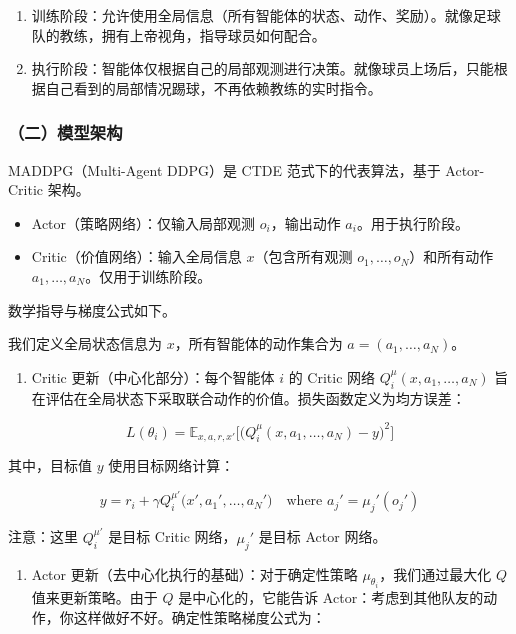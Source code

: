 \begin{enumerate}
\def\labelenumi{\arabic{enumi}.}
\item
  训练阶段：允许使用全局信息（所有智能体的状态、动作、奖励）。就像足球队的教练，拥有上帝视角，指导球员如何配合。
\item
  执行阶段：智能体仅根据自己的局部观测进行决策。就像球员上场后，只能根据自己看到的局部情况踢球，不再依赖教练的实时指令。
\end{enumerate}

\hypertarget{ux4e8cux6a21ux578bux67b6ux6784}{%
\subsubsection{（二）模型架构}\label{ux4e8cux6a21ux578bux67b6ux6784}}

MADDPG（Multi-Agent DDPG）是 CTDE 范式下的代表算法，基于 Actor-Critic 架构。

\begin{itemize}
\tightlist
\item
  Actor（策略网络）：仅输入局部观测 \(o_i\)，输出动作 \(a_i\)。用于执行阶段。
\item
  Critic（价值网络）：输入全局信息 \(x\)（包含所有观测 \(o_1,\ldots,o_N\)）和所有动作 \(a_1,\ldots,a_N\)。仅用于训练阶段。
\end{itemize}

数学指导与梯度公式如下。

我们定义全局状态信息为 \(x\)，所有智能体的动作集合为 \(a=(a_1,\ldots,a_N)\)。

\begin{enumerate}
\def\labelenumi{\arabic{enumi}.}
\tightlist
\item
{}
  Critic 更新（中心化部分）：每个智能体 \(i\) 的 Critic 网络 \(Q_i^{\mu}(x,a_1,\ldots,a_N)\) 旨在评估在全局状态下采取联合动作的价值。损失函数定义为均方误差：
\end{enumerate}

\[
L(\theta_i)
=
\mathbb{E}_{x,a,r,x'}
\bigl[
\bigl(
Q_i^{\mu}(x,a_1,\ldots,a_N)-y
\bigr)^{2}
\bigr]
\]

其中，目标值 \(y\) 使用目标网络计算：

\[
y
=
r_i
+
\gamma
Q_i^{\mu'}\bigl(
x',
a_1',
\ldots,
a_N'
\bigr)
\quad
\text{where }
a_j'=\mu_j'(o_j')
\]

注意：这里 \(Q_i^{\mu'}\) 是目标 Critic 网络，\(\mu_j'\) 是目标 Actor 网络。

\begin{enumerate}
\def\labelenumi{\arabic{enumi}.}
\setcounter{enumi}{1}
\tightlist
\item
{}
  Actor 更新（去中心化执行的基础）：对于确定性策略 \(\mu_{\theta_i}\)，我们通过最大化 \(Q\) 值来更新策略。由于 \(Q\) 是中心化的，它能告诉 Actor：考虑到其他队友的动作，你这样做好不好。确定性策略梯度公式为：
\end{enumerate}


